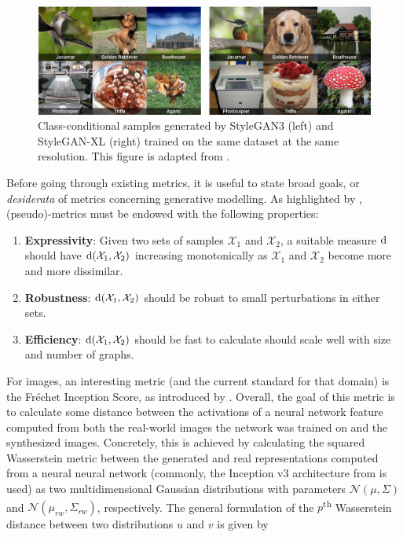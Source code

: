 \begin{figure}
  \centering
  \includegraphics[width=\textwidth]{figures/pathologies.png}
  \caption[Class-conditional samples from StyleGAN3 and
  StyleGAN-XL]{Class-conditional samples generated by StyleGAN3 (left) and
    StyleGAN-XL (right) trained on the same dataset at the same resolution. This
    figure is adapted from \cite{sauer2022stylegan}.}
  \label{fig:ganpathologies}
\end{figure}

Before going through existing metrics, it is useful to state broad goals, or
\emph{desiderata} of metrics concerning generative modelling. As highlighted by
\cite{o2021evaluation}, (pseudo)-metrics must be endowed with the following
properties:

\begin{enumerate}
\item \textbf{Expressivity}: Given two sets of samples $\mathcal{X}_1$ and
$\mathcal{X}_2$, a suitable measure $\text{d}$ should have
$\text{d}(\mathcal{X}_1,\mathcal{X}_2)$ increasing monotonically as
$\mathcal{X}_1$ and $\mathcal{X}_2$ become more and more dissimilar.
\item \textbf{Robustness}: $\text{d}(\mathcal{X}_1,\mathcal{X}_2)$ should be
robust to small perturbations in either sets.
\item \textbf{Efficiency}: $\text{d}(\mathcal{X}_1,\mathcal{X}_2)$ should be
fast to calculate should scale well with size and number of graphs.
\end{enumerate}


For images, an interesting metric (and the current standard for that domain) is
the Fr\'echet Inception Score, as introduced by \cite{heusel2017gans}. Overall,
the goal of this metric is to calculate some distance between the activations of
a neural network feature computed from both the real-world images the network
was trained on and the synthesized images. Concretely, this is achieved by
calculating the squared Wasserstein metric between the generated and real
representations computed from a neural neural network (commonly, the Inception
v3 architecture from \cite{szegedy2015rethinking} is used) as two
multidimensional Gaussian distributions with parameters $\mathcal{N}(\mu,
\Sigma)$ and $\mathcal{N}(\mu_{rw}, \Sigma_{rw})$, respectively. The general
formulation of the $p$\textsuperscript{th} Wasserstein distance between two
distributions $u$ and $v$ is given by

